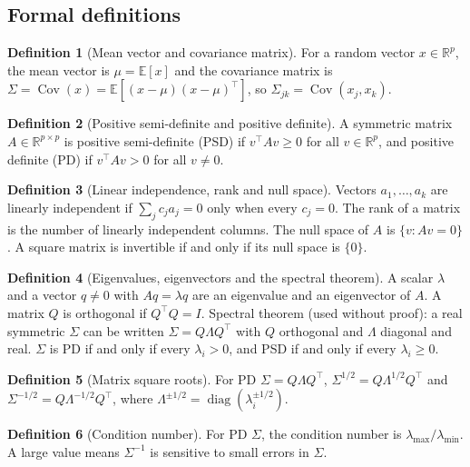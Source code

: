 \documentclass[11pt]{article}
\newcommand{\R}{\mathbb{R}}
\newcommand{\E}{\mathbb{E}}
\newcommand{\Cov}{\operatorname{Cov}}
\newcommand{\diag}{\operatorname{diag}}
\newcommand{\T}{^{\top}}
\theoremstyle{plain}
\theoremstyle{definition}
\newtheorem{definition}{Definition}
\theoremstyle{remark}
\begin{document}
\subsection{Formal definitions}
\begin{definition}[Mean vector and covariance matrix]
For a random vector $x\in\R^p$, the mean vector is $\mu=\E[x]$ and the covariance
matrix is $\Sigma=\Cov(x)=\E[(x-\mu)(x-\mu)\T]$, so $\Sigma_{jk}=\Cov(x_j,x_k)$.
\end{definition}

\begin{definition}[Positive semi-definite and positive definite]
A symmetric matrix $A\in\R^{p\times p}$ is positive semi-definite (PSD) if
$v\T Av\ge0$ for all $v\in\R^p$, and positive definite (PD) if $v\T Av>0$ for
all $v\ne0$.
\end{definition}

\begin{definition}[Linear independence, rank and null space]
Vectors $a_1,\dots,a_k$ are linearly independent if $\sum_j c_ja_j=0$ only when
every $c_j=0$. The rank of a matrix is the number of linearly independent
columns. The null space of $A$ is $\{v: Av=0\}$. A square matrix is invertible
if and only if its null space is $\{0\}$.
\end{definition}

\begin{definition}[Eigenvalues, eigenvectors and the spectral theorem]
A scalar $\lambda$ and a vector $q\ne0$ with $Aq=\lambda q$ are an eigenvalue and an
eigenvector of $A$. A matrix $Q$ is orthogonal if $Q\T Q=I$. Spectral theorem
(used without proof): a real symmetric $\Sigma$ can be written $\Sigma=Q\Lambda Q\T$
with $Q$ orthogonal and $\Lambda$ diagonal and real. $\Sigma$ is PD if and only if
every $\lambda_i>0$, and PSD if and only if every $\lambda_i\ge0$.
\end{definition}

\begin{definition}[Matrix square roots]
For PD $\Sigma=Q\Lambda Q\T$, $\Sigma^{1/2}=Q\Lambda^{1/2}Q\T$ and
$\Sigma^{-1/2}=Q\Lambda^{-1/2}Q\T$, where $\Lambda^{\pm1/2}=\diag(\lambda_i^{\pm1/2})$.
\end{definition}

\begin{definition}[Condition number]
For PD $\Sigma$, the condition number is $\lambda_{\max}/\lambda_{\min}$. A large
value means $\Sigma^{-1}$ is sensitive to small errors in $\Sigma$.
\end{definition}
\end{document}
